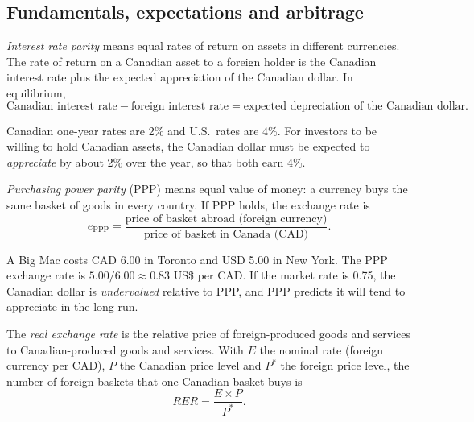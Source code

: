 \subsection{Fundamentals, expectations and arbitrage}

\begin{definition}
\emph{Interest rate parity} means equal rates of return on assets in different
currencies. The rate of return on a Canadian asset to a foreign holder is the Canadian
interest rate plus the expected appreciation of the Canadian dollar. In equilibrium,
\[
  \text{Canadian interest rate} - \text{foreign interest rate}
  = \text{expected depreciation of the Canadian dollar}.
\]
\end{definition}

\begin{example}
Canadian one-year rates are 2\% and U.S.\ rates are 4\%. For investors to be willing to
hold Canadian assets, the Canadian dollar must be expected to \emph{appreciate} by about
2\% over the year, so that both earn 4\%.
\end{example}

\begin{definition}
\emph{Purchasing power parity} (PPP) means equal value of money: a currency buys the same
basket of goods in every country. If PPP holds, the exchange rate is
\[
  e_{\text{PPP}} = \frac{\text{price of basket abroad (foreign currency)}}
  {\text{price of basket in Canada (CAD)}}.
\]
\end{definition}

\begin{example}
A Big Mac costs CAD 6.00 in Toronto and USD 5.00 in New York. The PPP exchange rate is
$5.00/6.00 \approx 0.83$ US\$ per CAD. If the market rate is 0.75, the Canadian dollar is
\emph{undervalued} relative to PPP, and PPP predicts it will tend to appreciate in the
long run.
\end{example}

\begin{definition}
The \emph{real exchange rate} is the relative price of foreign-produced goods and services
to Canadian-produced goods and services. With $E$ the nominal rate (foreign currency per
CAD), $P$ the Canadian price level and $P^{*}$ the foreign price level, the number of
foreign baskets that one Canadian basket buys is
\[
  RER = \frac{E \times P}{P^{*}}.
\]
\end{definition}

